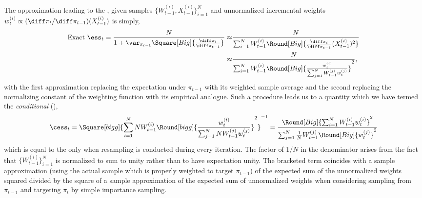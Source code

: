 The approximation leading to the \cess, given samples $\{W_{t-1}^{(i)},X_{t-1}^{(i)}\}_{i=1}^N$ and unnormalized incremental weights $w_{t}^{(i)} \propto (\diff\pi_t/\diff\pi_{t-1})(X_{t-1}^{(i)})$ is simply,
\begin{align*}
  \text{Exact }\ess_t = \frac{N}{1 + \var_{\pi_{t-1}}
    \Square[Big]{\frac{\diff\pi_t}{\diff\pi_{t-1}}}}
  \approx& \frac{N}{\sum_{i=1}^N W_{t-1}^{(i)}
    \Round[Big]{\frac{\diff\pi_t}{\diff\pi_{t-1}}(X_{t-1}^{(i)})^2}}\\
  \approx& \frac{N}{\sum_{i=1}^N W_{t-1}^{(i)}
    \Round[Big]{\frac{w_t^{(i)}}{\sum_{j=1}^N W_{t-1}^{(j)} w_t^{(j)}}}^2},
\end{align*}
with the first approximation replacing the expectation under $\pi_{t-1}$ with its weighted sample average and the second replacing the normalizing constant of the weighting function with its empirical analogue. Such a procedure leads us to a quantity which we have termed the \emph{conditional} \ess (\cess),
\begin{equation}
  \cess_t = \Square[bigg]{\sum_{i=1}^N N W_{t-1}^{(i)} \Round[bigg]{
        \frac{w_t^{(i)}}{\sum_{j=1}^N N W_{t-1}^{(j)}w_t^{(j)}}}^2}^{-1}
  = \frac{\Round[Big]{\sum_{i=1}^NW_{t-1}^{(i)}w_t^{(i)}}^2}
  {\sum_{j=1}^N \frac{1}{N} W_{t-1}^{(j)} \Round[Big]{w_t^{(j)}}^2}
\end{equation}
which is equal to the \ess only when resampling is conducted during every iteration. The factor of $1/N$ in the denominator arises from the fact that $\{W_{t-1}^{(i)}\}_{i=1}^N$ is normalized to sum to unity rather than to have expectation unity. The bracketed term coincides with a sample approximation (using the actual sample which is properly weighted to target $\pi_{t-1}$) of the expected sum of the unnormalized weights squared divided by the square of a sample approximation of the expected sum of unnormalized weights when considering sampling from $\pi_{t-1}$ and targeting $\pi_t$ by simple importance sampling.



